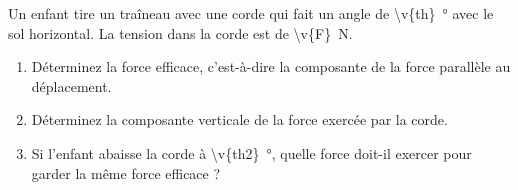 Un enfant tire un traîneau avec une corde qui fait un angle de \qty{\v{th}}{\degree} avec le sol horizontal. La tension dans la corde est de \qty{\v{F}}{N}.

\begin{enumerate}[label=\alph*)]
    \item Déterminez la force efficace, c'est-à-dire la composante de la force parallèle au déplacement.
    \item Déterminez la composante verticale de la force exercée par la corde.
    \item Si l'enfant abaisse la corde à \qty{\v{th2}}{\degree}, quelle force doit-il exercer pour garder la même force efficace ?
\end{enumerate}
